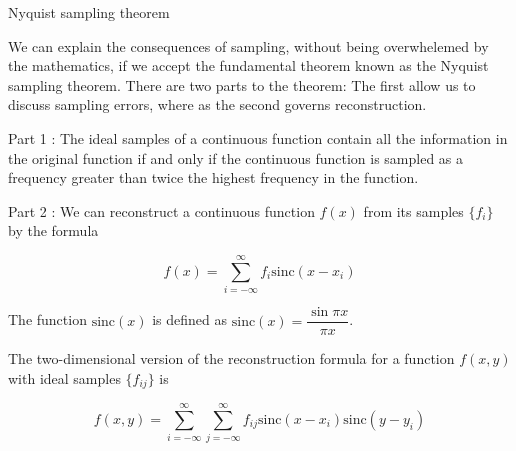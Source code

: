 \documentclass[10pt,a4paper]{article}
\begin{document}
\begin{enumerate}
		{\large \item Nyquist sampling theorem}
		
		We can explain the consequences of sampling, without being overwhelemed by the mathematics, if we accept the fundamental theorem known as the Nyquist sampling theorem. There are two parts to the theorem: The first allow us to discuss sampling errors, where as the second governs reconstruction.
		
		Part 1 : The ideal samples of a continuous function contain all the information in the original function if and only if the continuous function is sampled as a frequency greater than twice the highest frequency in the function.
		
		Part 2 : We can reconstruct a continuous function $ f(x) $ from its samples $ \{f_i\} $ by the formula
			
		$$ f(x) = \sum_{i = -\infty}^{\infty} f_i \mathrm{sinc}(x - x_i) $$
		
		The function $ \mathrm{sinc}(x) $ is defined as $ \mathrm{sinc}(x) = \dfrac{\sin \pi x}{\pi x} $.
		
		The two-dimensional version of the reconstruction formula for a function $ f(x, y) $ with ideal samples $ \{f_{ij}\} $ is
		
		$$ f(x, y) = \sum_{i = -\infty}^{\infty} \sum_{j = -\infty}^{\infty} f_{ij} \mathrm{sinc}(x - x_i) \mathrm{sinc}(y - y_i) $$
	\end{enumerate}
\end{document}
